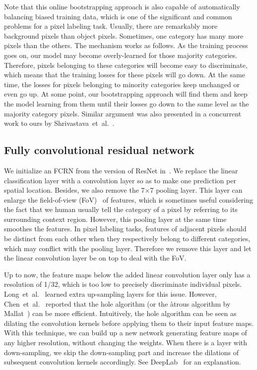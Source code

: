 \documentclass{article}
\begin{document}
Note that this online bootstrapping approach is also capable of automatically balancing biased training data,
which is one of the significant and common problems for a pixel labeling task.
Usually, there are remarkably more background pixels than object pixels.
Sometimes, one category has many more pixels than the others.
The mechanism works as follows.
As the training process goes on, our model may become overly-learned for those majority categories.
Therefore, pixels belonging to these categories will become easy to discriminate,
which means that the training losses for these pixels will go down.
At the same time, the losses for pixels belonging to minority categories keep unchanged or even go up.
At some point, our bootstrapping approach will find them and keep the model learning from them
until their losses go down to the same level as the majority category pixels.
Similar argument was also presented in a concurrent work to ours by Shrivastava~et~al.~\cite{OHEM.ICLR.2016.Loshchilov}.





\subsection{Fully convolutional residual network}


We initialize an FCRN from the version of ResNet in~\cite{ResNet.CVPR.2016.He}.
We replace the linear classification layer with a convolution layer so as to make one prediction per spatial
location.
Besides, we also remove the 7$\times$7 pooling layer.
This layer can enlarge the field-of-view (FoV)~\cite{DeepLab.ICLR.2015.Chen} of features,
which is sometimes useful considering the fact that we human usually tell the category of a pixel by referring
to its surrounding context region.
However, this pooling layer at the same time smoothes the features.
In pixel labeling tasks, features of adjacent pixels should be distinct from each other when they respectively
belong to different categories, which may conflict with the pooling layer.
Therefore we remove this layer and let the linear convolution layer be  on top to deal with the FoV.



Up to now, the feature maps below the added linear convolution layer only has a resolution of 1/32,
which is too low to precisely discriminate individual pixels.
Long~et~al.~\cite{FCN.CVPR.2015.Long} learned extra up-sampling layers for this issue.
However, Chen~et~al.~\cite{DeepLab.ICLR.2015.Chen} reported that
the hole algorithm (or the \`{a}trous algorithm by Mallat~\cite{WaveletTour.2008.Mallat})  can be  more efficient.
Intuitively, the hole algorithm can be seen as dilating the convolution kernels before applying them to their input feature maps.
With this technique, we can build up a new network generating feature maps of any higher resolution, without changing the weights.
When there is a layer with down-sampling, we
skip the down-sampling part and increase the dilations of subsequent convolution kernels accordingly.
See DeepLab~\cite{DeepLab.ICLR.2015.Chen} for an explanation.
\end{document}
